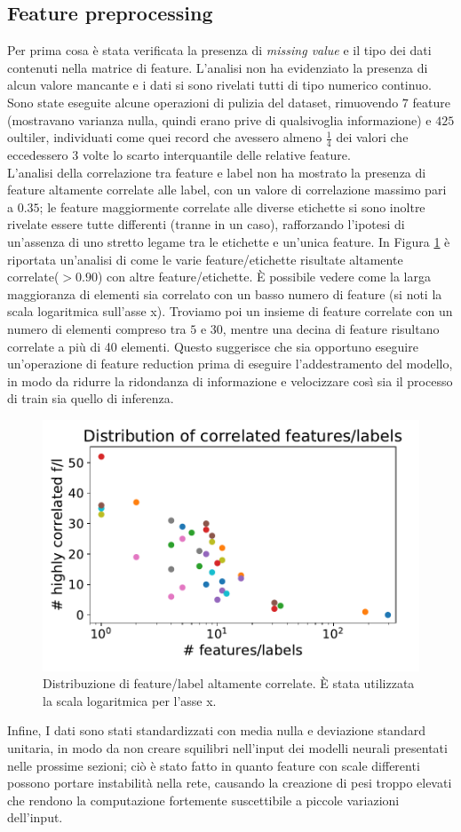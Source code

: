 \subsection{Feature preprocessing}
Per prima cosa è stata verificata la presenza di \textit{missing value} e il tipo dei dati contenuti nella matrice di feature. L'analisi non ha evidenziato la presenza di alcun valore mancante e i dati si sono rivelati tutti di tipo numerico continuo.\\
Sono state eseguite alcune operazioni di pulizia del dataset, rimuovendo $7$ feature (mostravano varianza nulla, quindi erano prive di qualsivoglia informazione) e $425$ oultiler, individuati come quei record che avessero almeno $\frac{1}{4}$ dei valori che eccedessero $3$ volte lo scarto interquantile delle relative feature.\\
L'analisi della correlazione tra feature e label non ha mostrato la presenza di feature altamente correlate alle label, con un valore di correlazione massimo pari a $0.35$; le feature maggiormente correlate alle diverse etichette si sono inoltre rivelate essere tutte differenti (tranne in un caso), rafforzando l'ipotesi di un'assenza di uno stretto legame tra le etichette e un'unica feature.
In Figura \ref{fig:distributionhighcorr} è riportata un'analisi di come le varie feature/etichette risultate altamente correlate($> 0.90$) con altre feature/etichette. È possibile vedere come la larga maggioranza di elementi sia correlato con un basso numero di feature (si noti la scala logaritmica sull'asse x). Troviamo poi un insieme di feature correlate con un numero di elementi compreso tra $5$ e $30$, mentre una decina di feature risultano correlate a più di 40 elementi. Questo suggerisce che sia opportuno eseguire un'operazione di feature reduction prima di eseguire l'addestramento del modello, in modo da ridurre la ridondanza di informazione e velocizzare così sia il processo di train sia quello di inferenza.
\begin{figure}
	\centering
	\includegraphics[width=0.7\linewidth]{../images/pdf/distribution_high_corr}
	\caption{Distribuzione di feature/label altamente correlate. È stata utilizzata la scala logaritmica per l'asse x.}
	\label{fig:distributionhighcorr}
\end{figure}
Infine, I dati sono stati  standardizzati con media nulla e deviazione standard unitaria, in modo da non creare squilibri nell'input dei modelli neurali presentati nelle prossime sezioni; ciò è stato fatto in quanto feature con scale differenti possono portare instabilità nella rete, causando la creazione di pesi troppo elevati che rendono la computazione fortemente suscettibile a piccole variazioni dell'input.
